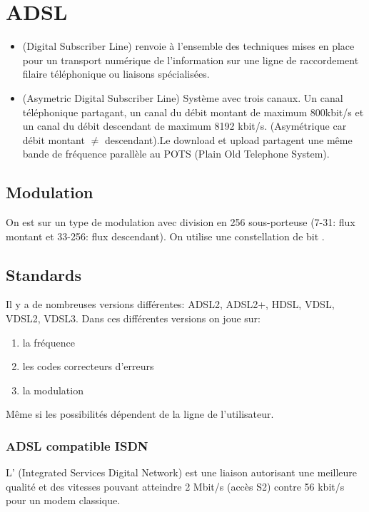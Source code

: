 \chapter{ADSL}

\begin{itemize}
\item {} (Digital Subscriber Line) renvoie à l'ensemble des techniques mises en place pour un transport numérique de l'information sur une ligne de raccordement filaire téléphonique ou liaisons spécialisées.

\item {} (Asymetric Digital Subscriber Line) Système avec trois canaux. Un canal téléphonique partagant, un canal du débit montant de maximum 800kbit/s et un canal du débit descendant de maximum 8192 kbit/s. (Asymétrique car débit montant $\neq$ descendant).Le download et upload partagent une même bande de fréquence parallèle au POTS (Plain Old Telephone System).
\end{itemize}

\section{Modulation}

On est sur un type de modulation  avec division en 256 sous-porteuse (7-31: flux montant et 33-256: flux descendant). On utilise une constellation de bit .

\section{Standards}

Il y a de nombreuses versions différentes: ADSL2, ADSL2+, HDSL, VDSL, VDSL2, VDSL3. Dans ces différentes versions on joue sur:
\begin{enumerate}
\item la fréquence
\item les codes correcteurs d'erreurs
\item la modulation
\end{enumerate}
Même si les possibilités dépendent de la ligne de l'utilisateur.

\subsection{ADSL compatible ISDN}

L' (Integrated Services Digital Network) est une liaison autorisant une meilleure qualité et des vitesses pouvant atteindre 2 Mbit/s (accès S2) contre 56 kbit/s pour un modem classique.

